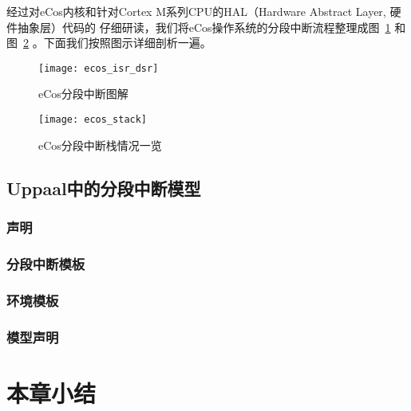 经过对eCos内核和针对Cortex M系列CPU的HAL（Hardware Abstract Layer, 硬件抽象层）代码的
仔细研读，我们将eCos操作系统的分段中断流程整理成图~\ref{fig:ecos_isr_dsr} 和
图~\ref{fig:ecos_stack} 。下面我们按照图示详细剖析一遍。

\begin{figure}[H]
	\centering
	\texttt{[image: ecos\_isr\_dsr]}
	\caption{eCos分段中断图解}
	\label{fig:ecos_isr_dsr}
\end{figure}

\begin{figure}[H]
	\centering
	\texttt{[image: ecos\_stack]}
	\caption{eCos分段中断栈情况一览}
	\label{fig:ecos_stack}
\end{figure}

\subsection{Uppaal中的分段中断模型}
\label{subsec:segment_uppaal}

\subsubsection{声明}
\label{subsubsec:segment_decl}

\subsubsection{分段中断模板}
\label{subsubsec:segment_intr}

\subsubsection{环境模板}
\label{subsubsec:segment_env}

\subsubsection{模型声明}
\label{subsubsec:segment_model_decl}

\section{本章小结}
\label{sec:sum_3}
